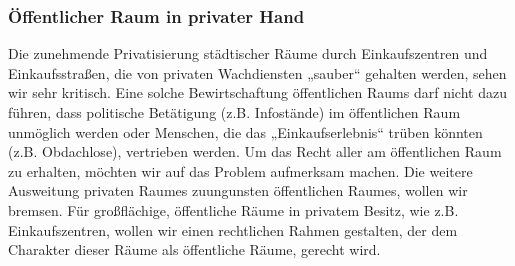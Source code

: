 \subsubsection{Öffentlicher Raum in privater Hand}

Die zunehmende Privatisierung städtischer Räume durch Einkaufszentren und Einkaufsstraßen, die von privaten Wachdiensten „sauber`` gehalten werden, sehen wir sehr kritisch. Eine solche Bewirtschaftung öffentlichen Raums darf nicht dazu führen, dass politische Betätigung (z.B. Infostände) im öffentlichen Raum unmöglich werden oder Menschen, die das „Einkaufserlebnis`` trüben könnten (z.B. Obdachlose), vertrieben werden. Um das Recht aller am öffentlichen Raum zu erhalten, möchten wir auf das Problem aufmerksam machen. Die weitere Ausweitung privaten Raumes zuungunsten öffentlichen Raumes, wollen wir bremsen. Für großflächige, öffentliche Räume in privatem Besitz, wie z.B. Einkaufszentren, wollen wir einen rechtlichen Rahmen gestalten, der dem Charakter dieser Räume als öffentliche Räume, gerecht wird.
